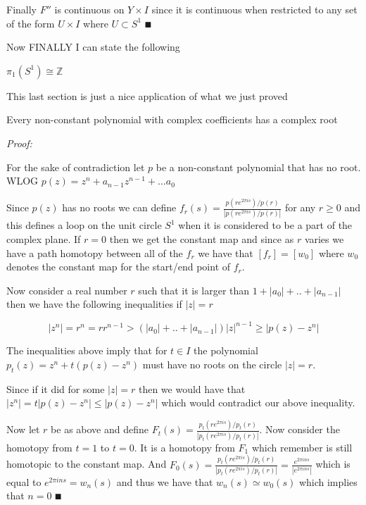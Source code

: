 \documentclass[paper=a4,fontsize=paper,12.5pt]{book}
\newcommand{\3}{\vspace*{3mm}}
\newcommand{\Proof}{\textit{Proof:}}
\newcommand{\Z}{\mathbb{Z}}
\newcommand{\C}[1]{{S}^{#1}}
\begin{document}
\3

Finally $F''$ is continuous on $Y \times I$ since it is continuous when restricted to any set of the form $U \times I$ where $U \subset \C{1}$ $\QED$

\newpage

Now FINALLY I can state the following

\begin{corollary}

${\pi}_{1}(\C{1}) \cong \Z$

\end{corollary} 

\3

This last section is just a nice application of what we just proved

\3

\begin{theorem}

Every non-constant polynomial with complex coefficients has a complex root


\end{theorem}

\Proof

For the sake of contradiction let $p$ be a non-constant polynomial that has no root. WLOG $p(z) = {z}^{n} + {a}_{n-1}{z}^{n-1} + ... {a}_{0}$

\3

Since $p(z)$ has no roots we can define ${f}_{r}(s) = \frac{p(r{e}^{2\pi i s})/p(r)}{|p(r{e}^{2\pi i s})/p(r)|}$ for any $r \geq 0$ and this defines a loop on the unit circle $\C{1}$ when it is considered to be a part of the complex plane. If $r = 0$ then we get the constant map and since as $r$ varies we have a path homotopy between all of the ${f}_{r}$ we have that $[f_{r}] = [{w}_{0}]$ where ${w}_{0}$ denotes the constant map for the start/end point of ${f}_{r}$.

\3

Now consider a real number $r$ such that it is larger than $1 + |{a}_{0}| + .. + |{a}_{n-1}|$ then we have the following inequalities if $|z| = r$

\3

\[|{z}^{n}| = {r}^{n} = {r}{r}^{n-1} > (|a_{0}| + .. + |a_{n-1}|){|z|}^{n-1} \geq |p(z) - {z}^{n}| \]

\3

The inequalities above imply that for $t \in I$ the polynomial $p_{t}(z) = {z}^{n} + t(p(z) - {z}^{n})$ must have no roots on the circle $|z| = r$.


Since if it did for some $|z| = r$ then we would have that $|{z}^{n}| = t|p(z) - {z}^{n}| \leq |p(z) - {z}^{n}|$ which would contradict our above inequality.

\3

Now let $r$ be as above and define ${F}_{t}(s) = \frac{p_{t}(r{e}^{2\pi i s})/p_{t}(r)}{|p_{t}(r{e}^{2\pi i s})/p_{t}(r)|}$. Now consider the homotopy from $t = 1$ to $t = 0$. It is a homotopy from ${F}_{1}$ which remember is still homotopic to the constant map. And $F_{0}(s) = \frac{p_{t}(r{e}^{2\pi i s})/p_{t}(r)}{|p_{t}(r{e}^{2\pi i s})/p_{t}(r)|} = \frac{e^{2 \pi i n s}}{|{e}^{2\pi i n s}|} $ which is equal to ${e}^{2\pi i n s} = {w}_{n}(s)$ and thus we have that ${w}_{n}(s) \simeq {w}_{0}(s)$ which implies that $n = 0$ $\QED$

\3
\end{document}
